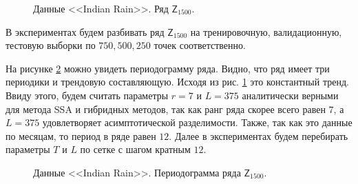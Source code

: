 \documentclass[specialist,
               substylefile = spbu.rtx,
               subf,href,colorlinks=true, 12p]{disser}
\begin{document}
\begin{figure}[H]
	\captionsetup{justification=centering}
	\caption{Данные <<Indian Rain>>. Ряд $\mathsf{Z}_{1500}$.}
	\label{indian_rain_img}
\end{figure}

В экспериментах будем разбивать ряд $\mathsf{Z}_{1500}$ на тренировочную, валидационную, тестовую выборки по $750, 500, 250$ точек соответственно.

На рисунке \ref{indian_rain_pgram} можно увидеть периодограмму ряда. Видно, что ряд имеет три периодики и трендовую составляющую. Исходя из рис. \ref{indian_rain_img} это константный тренд. Ввиду этого, будем считать параметры $r=7$ и $L = 375$ аналитически верными для метода SSA и гибридных методов, так как ранг ряда скорее всего равен $7$, а $L = 375$ удовлетворяет асимптотической разделимости. Также, так как это данные по месяцам, то период в ряде равен $12$. Далее в экспериментах будем перебирать параметры $T$ и $L$ по сетке с шагом кратным $12$.

\begin{figure}[H]
	\captionsetup{justification=centering}
	\caption{Данные <<Indian Rain>>. Периодограмма ряда $\mathsf{Z}_{1500}$.}
	\label{indian_rain_pgram}
\end{figure}
\end{document}
